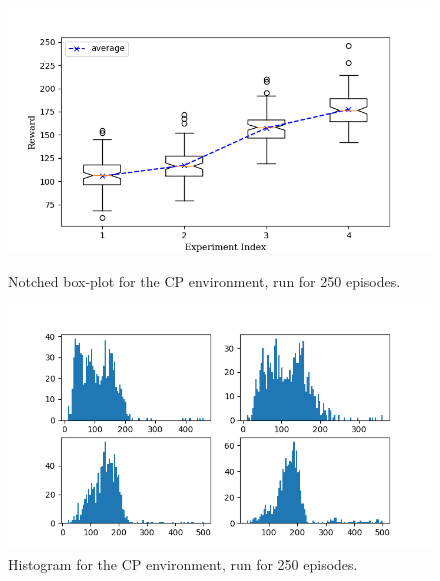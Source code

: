 \documentclass[hidelinks,journal]{IEEEtran}
\begin{document}
\begin{appendices}
\begin{figure}[!h]
  \centering
  \includegraphics[scale=1]{graph/cp2ResBox.png}
  \caption{Notched box-plot for the CP environment, run for 250 episodes.}
  \includegraphics[scale=1]{graph/cp2ResHist.png}
  \caption{Histogram for the CP environment, run for 250 episodes.}
\end{figure}

\pagebreak


\end{appendices}
\end{document}
